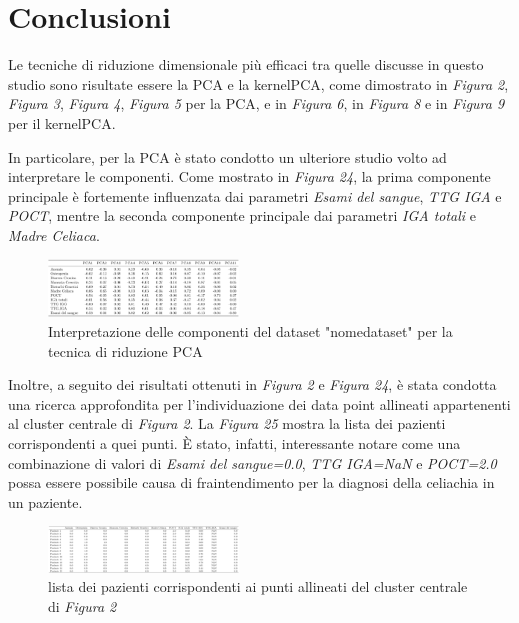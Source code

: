 \documentclass[11pt,a4paper,twocolumn]{article}
\begin{document}
\section{Conclusioni}
Le tecniche di riduzione dimensionale più efficaci tra quelle discusse in questo studio sono risultate essere la PCA e la kernelPCA, come dimostrato in \emph{Figura 2}, \emph{Figura 3}, \emph{Figura 4}, \emph{Figura 5} per la PCA, e in \emph{Figura 6}, in \emph{Figura 8} e in \emph{Figura 9} per il kernelPCA. \par

In particolare, per la PCA è stato condotto un ulteriore studio volto ad interpretare le componenti. Come mostrato in \emph{Figura 24}, la prima componente principale è fortemente influenzata dai parametri \emph{Esami del sangue}, \emph{TTG IGA} e \emph{POCT}, mentre la seconda componente principale dai parametri \emph{IGA totali} e \emph{Madre Celiaca}.

\begin{figure}[H]
	\centering
	\includegraphics[width=0.45\textwidth]{img/PCA_components_interpretation.png}
	\caption{Interpretazione delle componenti del dataset "nomedataset" per la tecnica di riduzione PCA}
\end{figure}

Inoltre, a seguito dei risultati ottenuti in \emph{Figura 2} e \emph{Figura 24}, è stata condotta una ricerca approfondita per l'individuazione dei data point allineati appartenenti al cluster centrale di \emph{Figura 2}. La \emph{Figura 25} mostra la lista dei pazienti corrispondenti a quei punti. È stato, infatti, interessante notare come una combinazione di valori di \emph{Esami del sangue=0.0}, \emph{TTG IGA=NaN} e \emph{POCT=2.0} possa essere possibile causa di fraintendimento per la diagnosi della celiachia in un paziente.

\begin{figure}[H]
	\centering
	\includegraphics[width=0.45\textwidth]{img/pazientiFiltrati.png}
	\caption{lista dei pazienti corrispondenti ai punti allineati del cluster centrale di \emph{Figura 2}}
\end{figure}
\end{document}
